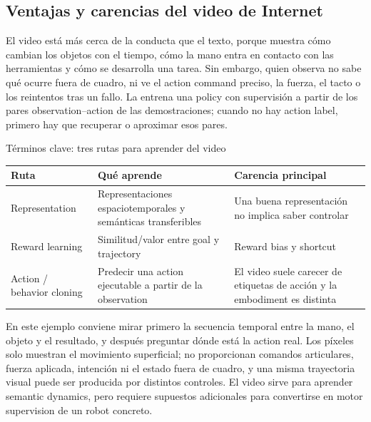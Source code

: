 \subsection{Ventajas y carencias del video de Internet}

El video está más cerca de la conducta que el texto, porque muestra cómo cambian los objetos con el tiempo, cómo la mano entra en contacto con las herramientas y cómo se desarrolla una tarea. Sin embargo, quien observa no sabe qué ocurre fuera de cuadro, ni ve el action command preciso, la fuerza, el tacto o los reintentos tras un fallo. La  entrena una policy con supervisión a partir de los pares observation--action de las demostraciones; cuando no hay action label, primero hay que recuperar o aproximar esos pares.


\begin{knowledgebox}{Términos clave: tres rutas para aprender del video}
\begin{tabularx}{\textwidth}{@{}L{0.19\textwidth}X X@{}}
\toprule
Ruta & Qué aprende & Carencia principal \\
\midrule
Representation & Representaciones espaciotemporales y semánticas transferibles & Una buena representación no implica saber controlar \\
Reward learning & Similitud/valor entre goal y trajectory & Reward bias y shortcut \\
Action / behavior cloning & Predecir una action ejecutable a partir de la observation & El video suele carecer de etiquetas de acción y la embodiment es distinta \\
\bottomrule
\end{tabularx}
\end{knowledgebox}


En este ejemplo conviene mirar primero la secuencia temporal entre la mano, el objeto y el resultado, y después preguntar dónde está la action real. Los píxeles solo muestran el movimiento superficial; no proporcionan comandos articulares, fuerza aplicada, intención ni el estado fuera de cuadro, y una misma trayectoria visual puede ser producida por distintos controles. El video sirve para aprender semantic dynamics, pero requiere supuestos adicionales para convertirse en motor supervision de un robot concreto.

